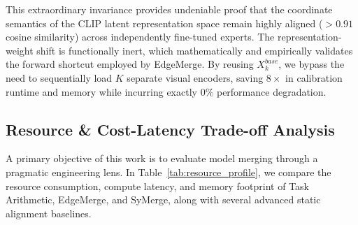 This extraordinary invariance provides undeniable proof that the coordinate semantics of the CLIP latent representation space remain highly aligned ($>0.91$ cosine similarity) across independently fine-tuned experts. The representation-weight shift is functionally inert, which mathematically and empirically validates the forward shortcut employed by EdgeMerge. By reusing $X_k^{base}$, we bypass the need to sequentially load $K$ separate visual encoders, saving $8\times$ in calibration runtime and memory while incurring exactly $0\%$ performance degradation.

\subsection{Resource \& Cost-Latency Trade-off Analysis}

A primary objective of this work is to evaluate model merging through a pragmatic engineering lens. In Table~\ref{tab:resource_profile}, we compare the resource consumption, compute latency, and memory footprint of Task Arithmetic, EdgeMerge, and SyMerge, along with several advanced static alignment baselines.

